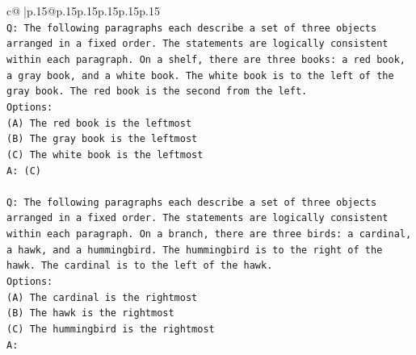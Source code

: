 \documentclass{article}
\begin{document}
{\begin{supertabular}{c@{$\;$}|p{.15\linewidth}@{}p{.15\linewidth}p{.15\linewidth}p{.15\linewidth}p{.15\linewidth}p{.15\linewidth}}
{{{\\ 
\texttt{Q: The following paragraphs each describe a set of three objects arranged in a fixed order. The statements are logically consistent within each paragraph. On a shelf, there are three books: a red book, a gray book, and a white book. The white book is to the left of the gray book. The red book is the second from the left.} \\
\texttt{Options:} \\
\texttt{(A) The red book is the leftmost} \\
\texttt{(B) The gray book is the leftmost} \\
\texttt{(C) The white book is the leftmost} \\
\texttt{A: (C)} \\
\\ 
\texttt{Q: The following paragraphs each describe a set of three objects arranged in a fixed order. The statements are logically consistent within each paragraph. On a branch, there are three birds: a cardinal, a hawk, and a hummingbird. The hummingbird is to the right of the hawk. The cardinal is to the left of the hawk.} \\
\texttt{Options:} \\
\texttt{(A) The cardinal is the rightmost} \\
\texttt{(B) The hawk is the rightmost} \\
\texttt{(C) The hummingbird is the rightmost} \\
\texttt{A:} \\
            }
        }
    }
     \\ \\


\end{supertabular}}
\end{document}

